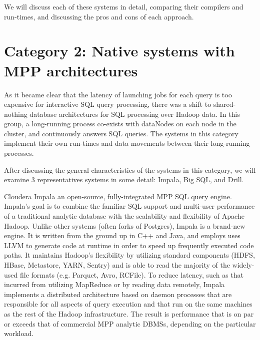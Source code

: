 \documentclass{vldb}
\begin{document}
We will discuss each of these systems in detail, comparing their compilers and run-times, and discussing the pros and cons of each approach.


\section{Category 2: Native systems with MPP architectures}

As it became clear that the latency of launching jobs for each query is too expensive for interactive SQL query processing, there was a shift to shared-nothing database architectures for SQL processing over Hadoop data. In this group, a long-running process co-exists with dataNodes on each node in the cluster, and continuously answers SQL queries. The systems in this category implement their own run-times and data movements between their long-running processes. 

After discussing the general characteristics of the systems in this category, we will examine 3 representatives systems in some detail: Impala, Big SQL, and Drill. 

Cloudera Impala \cite{Kornacker+15} an open-source, fully-integrated MPP SQL query engine. Impala's goal is to combine the familiar SQL support and multi-user performance of a traditional analytic database with the scalability and flexibility of Apache Hadoop. Unlike other systems (often forks of Postgres), Impala is a brand-new engine. It is written from the ground up in C++ and Java, and employs uses LLVM to generate code at runtime in order to speed up frequently executed code paths. It maintains Hadoop's flexibility by utilizing standard components (HDFS, HBase, Metastore, YARN, Sentry) and is able to read the majority of the widely-used file formats (e.g. Parquet, Avro, RCFile). To reduce latency, such as that incurred from utilizing MapReduce or by reading data remotely, Impala implements a distributed architecture based on daemon processes that are responsible for all aspects of query execution and that run on the same machines as the rest of the Hadoop infrastructure. The result is performance that is on par or exceeds that of commercial MPP analytic DBMSs, depending on the particular workload.
\end{document}
